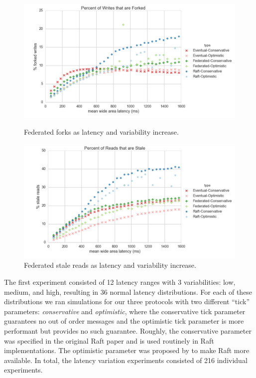 \documentclass{article}
\begin{document}
\begin{figure}
    \centering
      \includegraphics[width=\linewidth]{figures/federated/percent_forked_writes_latency}
      \caption{Federated forks as latency and variability increase.}
      \label{fig:latency_forked_writes}
    \endminipage\hfill
      \includegraphics[width=\linewidth]{figures/federated/percent_stale_reads_latency}
      \caption{Federated stale reads as latency and variability increase.}
      \label{fig:latency_stale_reads}
    \endminipage
\end{figure}

The first experiment consisted of 12 latency ranges with 3 variabilities: low, medium, and high, resulting in 36 normal latency distributions. For each of these distributions we ran simulations for our three protocols with two different ``tick'' parameters: \emph{conservative} and \emph{optimistic}, where the conservative tick parameter guarantees no out of order messages and the optimistic tick parameter is more performant but provides no such guarantee. Roughly, the conservative parameter was specified in the original Raft paper and is used routinely in Raft implementations. The optimistic parameter was proposed by \cite{howard_raft_2015} to make Raft more available. In total, the latency variation experiments consisted of 216 individual experiments.
\end{document}
